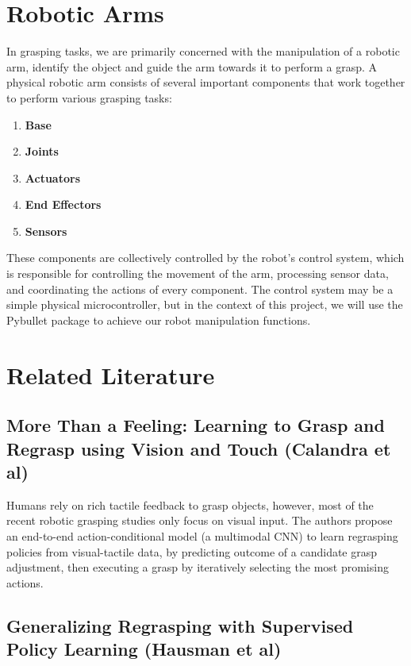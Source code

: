 \documentclass[12pt, a4paper]{report}
\theoremstyle{definition}
\begin{document}
\section{Robotic Arms}
In grasping tasks, we are primarily concerned with the manipulation of a robotic arm, identify the object and guide the arm towards it to perform a grasp. A physical robotic arm consists of several important components that work together to perform various grasping tasks:
\begin{enumerate}
    \item \textbf{Base}
    \item \textbf{Joints}
    \item \textbf{Actuators}
    \item \textbf{End Effectors}
    \item \textbf{Sensors}
\end{enumerate}

These components are collectively controlled by the robot's control system, which is responsible for controlling the movement of the arm, processing sensor data, and coordinating the actions of every component. The control system may be a simple physical microcontroller, but in the context of this project, we will use the Pybullet \cite{pybullet} package to achieve our robot manipulation functions.

\section{Related Literature}
\label{sec:2.3}


\subsection{More Than a Feeling: Learning to Grasp and Regrasp using Vision and Touch (Calandra et al)\cite{calandra}}
\label{sec:2.3.1}
Humans rely on rich tactile feedback to grasp objects, however, most of the recent robotic grasping studies only focus on visual input. The authors propose an end-to-end action-conditional model (a multimodal CNN) to learn regrasping policies from visual-tactile data, by predicting outcome of a candidate grasp adjustment, then executing a grasp by iteratively selecting the most promising actions\cite{calandra}.


\subsection{Generalizing Regrasping with Supervised Policy Learning (Hausman et al)\cite{hausman}}
\label{sec:2.3.2}
\end{document}
